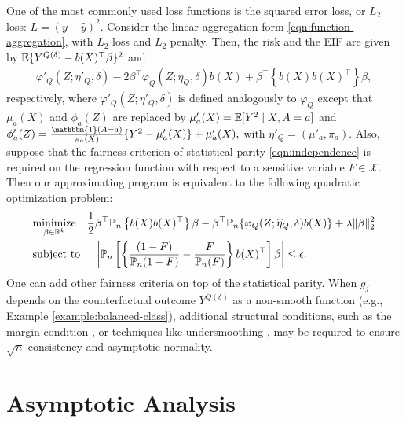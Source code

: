 \begin{example2} \label{example:l2-loss}
One of the most commonly used loss functions is the squared error loss, or $L_2$ loss: $L=(y-\widehat{y})^2$.
Consider the linear aggregation form \eqref{eqn:function-aggregation}, with $L_2$ loss and $L_2$ penalty. Then, the risk and the EIF are given by $\mathbb{E}\{Y^{Q(\delta)} - b(X)^\top\beta \}^2$ and
\begin{align*}
    \varphi'_Q(Z;\eta'_Q,\delta) - 2\beta^\top \varphi_Q(Z;\eta_Q,\delta)b(X) + \beta^\top \left\{b(X)b(X)^\top \right\}\beta,
\end{align*}
respectively, where $\varphi'_Q(Z;\eta'_Q,\delta)$ is defined analogously to $\varphi_Q$ except that $\mu_a(X)$ and $\phi_a(Z)$ are replaced by $\mu'_a(X) = \mathbb{E}[Y^2 \mid X,A=a]$ and
$
\phi'_a(Z) = \frac{\mathbbm{1}(A = a)}{\pi_a(X)} \{Y^2 - \mu'_a(X) \} + \mu'_a(X),
$
with $\eta'_Q=(\mu'_a,\pi_a)$. Also, suppose that the fairness criterion of statistical parity \eqref{eqn:independence} is required on the regression function with respect to a sensitive variable $F \in \mathcal{X}$. Then our approximating program is equivalent to the following quadratic optimization problem:
\begin{align*}
    & \underset{\beta \in \mathbb{R}^k}{\text{minimize}} \quad \frac{1}{2}\beta^\top \mathbb{P}_n\left\{b(X)b(X)^\top \right\}\beta - \beta^\top \mathbb{P}_n\{\varphi_Q(Z;\widehat{\eta}_Q,\delta)b(X)\} + \lambda\Vert \beta \Vert_2^2 \\
     & \text{subject to } \quad \left\vert  \mathbb{P}_n\left[\left\{\frac{(1-F)}{\mathbb{P}_n(1-F)} - \frac{F}{\mathbb{P}_n(F)}\right\} b(X)^\top\right] \beta \right\vert \leq \epsilon.
\end{align*}
One can add other fairness criteria on top of the statistical parity. When $g_j$ depends on the counterfactual outcome $Y^{Q(\delta)}$ as a non-smooth function (e.g., Example \ref{example:balanced-class}), additional structural conditions, such as the margin condition \citep[e.g.,][]{kim2023fair}, or techniques like undersmoothing \citep[e.g.,][]{kennedy2017non}, may be required to ensure $\sqrt{n}$-consistency and asymptotic normality.
\end{example2}



\section{Asymptotic Analysis} \label{sec:analysis}

